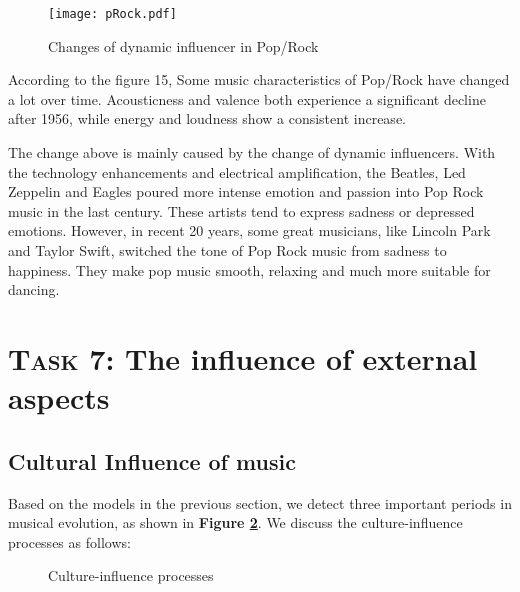\documentclass[12pt]{article}  %
\begin{document}
	\begin{figure}[htbp]
		\centering
		\texttt{[image: pRock.pdf]} 	%
		\caption{Changes of dynamic influencer in Pop/Rock}		%
		\label{fig:pr10}							%
	\end{figure}
	
	According to the figure 15, Some music characteristics of Pop/Rock have changed a lot over
	time. Acousticness and valence both experience a significant decline after 1956, while energy
	and loudness show a consistent increase.
	
	The change above is mainly caused by the change of dynamic influencers. With the technology enhancements and electrical amplification, the Beatles, Led Zeppelin and Eagles poured
	more intense emotion and passion into Pop Rock music in the last century. These artists tend to
	express sadness or depressed emotions. However, in recent 20 years, some great musicians, like
	Lincoln Park and Taylor Swift, switched the tone of Pop Rock music from sadness to happiness.
	They make pop music smooth, relaxing and much more suitable for dancing.
	
	\section{\textsc{Task 7}: The influence of external aspects}
	\subsection{Cultural Influence of music}\label{sec7.1}
	
	Based on the models in the previous section, we detect three important periods in musical evolution, as shown in \textbf{Figure \ref{Fig:cip}}. We discuss the culture-influence processes as follows:
	
	\begin{figure}[htbp]
		\centering    
		\caption{Culture-influence processes}		%
		\label{Fig:cip}									%
	\end{figure}
	
\end{document}
